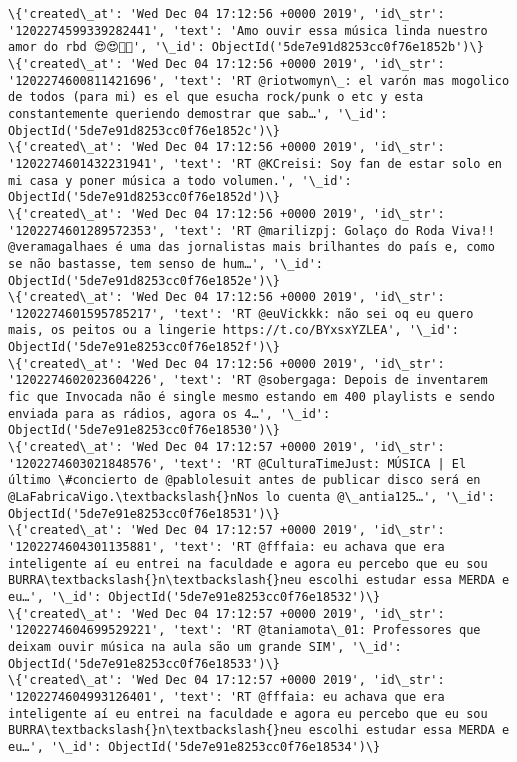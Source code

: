 \documentclass[11pt]{article}
\begin{document}
\begin{Verbatim}[commandchars=\\\{\}]
\{'created\_at': 'Wed Dec 04 17:12:56 +0000 2019', 'id\_str': '1202274599339282441', 'text': 'Amo ouvir essa música linda nuestro amor do rbd 😍😍💙💜', '\_id': ObjectId('5de7e91d8253cc0f76e1852b')\}
\{'created\_at': 'Wed Dec 04 17:12:56 +0000 2019', 'id\_str': '1202274600811421696', 'text': 'RT @riotwomyn\_: el varón mas mogolico de todos (para mi) es el que esucha rock/punk o etc y esta constantemente queriendo demostrar que sab…', '\_id': ObjectId('5de7e91d8253cc0f76e1852c')\}
\{'created\_at': 'Wed Dec 04 17:12:56 +0000 2019', 'id\_str': '1202274601432231941', 'text': 'RT @KCreisi: Soy fan de estar solo en mi casa y poner música a todo volumen.', '\_id': ObjectId('5de7e91d8253cc0f76e1852d')\}
\{'created\_at': 'Wed Dec 04 17:12:56 +0000 2019', 'id\_str': '1202274601289572353', 'text': 'RT @marilizpj: Golaço do Roda Viva!! @veramagalhaes é uma das jornalistas mais brilhantes do país e, como se não bastasse, tem senso de hum…', '\_id': ObjectId('5de7e91d8253cc0f76e1852e')\}
\{'created\_at': 'Wed Dec 04 17:12:56 +0000 2019', 'id\_str': '1202274601595785217', 'text': 'RT @euVickkk: não sei oq eu quero mais, os peitos ou a lingerie https://t.co/BYxsxYZLEA', '\_id': ObjectId('5de7e91e8253cc0f76e1852f')\}
\{'created\_at': 'Wed Dec 04 17:12:56 +0000 2019', 'id\_str': '1202274602023604226', 'text': 'RT @sobergaga: Depois de inventarem fic que Invocada não é single mesmo estando em 400 playlists e sendo enviada para as rádios, agora os 4…', '\_id': ObjectId('5de7e91e8253cc0f76e18530')\}
\{'created\_at': 'Wed Dec 04 17:12:57 +0000 2019', 'id\_str': '1202274603021848576', 'text': 'RT @CulturaTimeJust: MÚSICA | El último \#concierto de @pablolesuit antes de publicar disco será en @LaFabricaVigo.\textbackslash{}nNos lo cuenta @\_antia125…', '\_id': ObjectId('5de7e91e8253cc0f76e18531')\}
\{'created\_at': 'Wed Dec 04 17:12:57 +0000 2019', 'id\_str': '1202274604301135881', 'text': 'RT @fffaia: eu achava que era inteligente aí eu entrei na faculdade e agora eu percebo que eu sou BURRA\textbackslash{}n\textbackslash{}neu escolhi estudar essa MERDA e eu…', '\_id': ObjectId('5de7e91e8253cc0f76e18532')\}
\{'created\_at': 'Wed Dec 04 17:12:57 +0000 2019', 'id\_str': '1202274604699529221', 'text': 'RT @taniamota\_01: Professores que deixam ouvir música na aula são um grande SIM', '\_id': ObjectId('5de7e91e8253cc0f76e18533')\}
\{'created\_at': 'Wed Dec 04 17:12:57 +0000 2019', 'id\_str': '1202274604993126401', 'text': 'RT @fffaia: eu achava que era inteligente aí eu entrei na faculdade e agora eu percebo que eu sou BURRA\textbackslash{}n\textbackslash{}neu escolhi estudar essa MERDA e eu…', '\_id': ObjectId('5de7e91e8253cc0f76e18534')\}

\end{Verbatim}
\end{document}
